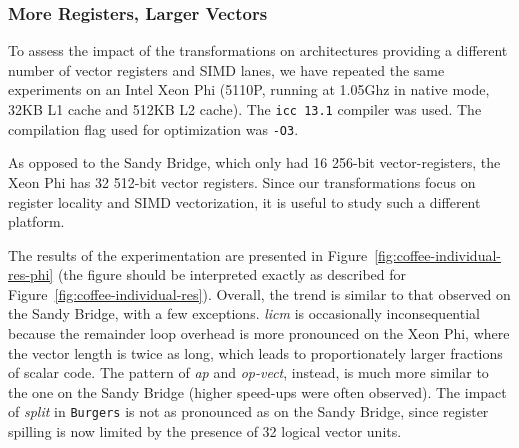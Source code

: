 \subsubsection{More Registers, Larger Vectors}
To assess the impact of the transformations on architectures providing a different number of vector registers and SIMD lanes, we have repeated the same experiments on an Intel Xeon Phi (5110P, running at 1.05Ghz in native mode, 32KB L1 cache and 512KB L2 cache). The \texttt{icc 13.1} compiler was used. The compilation flag used for optimization was \texttt{-O3}. 

As opposed to the Sandy Bridge, which only had 16 256-bit vector-registers, the Xeon Phi has 32 512-bit vector registers. Since our transformations focus on register locality and SIMD vectorization, it is useful to study such a different platform. 

The results of the experimentation are presented in Figure~\ref{fig:coffee-individual-res-phi} (the figure should be interpreted exactly as described for Figure~\ref{fig:coffee-individual-res}). Overall, the trend is similar to that observed on the Sandy Bridge, with a few exceptions. {\em licm} is occasionally inconsequential because the remainder loop overhead is more pronounced on the Xeon Phi, where the vector length is twice as long, which leads to proportionately larger fractions of scalar code. The pattern of {\em ap} and {\em op-vect}, instead, is much more similar to the one on the Sandy Bridge (higher speed-ups were often observed). The impact of {\em split} in {\tt Burgers} is not as pronounced as on the Sandy Bridge, since register spilling is now limited by the presence of 32 logical vector units. 

